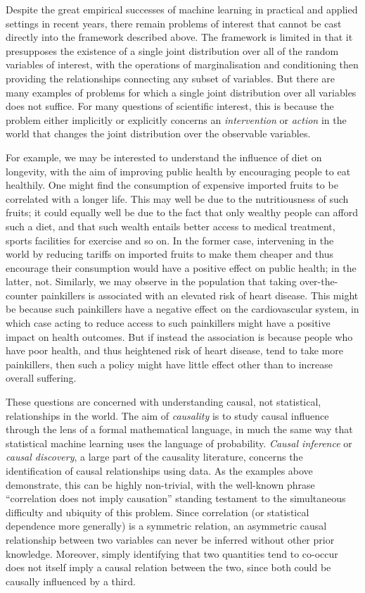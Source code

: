Despite the great empirical successes of machine learning in practical and applied settings in recent years, there remain problems of interest that cannot be cast directly into the framework described above. 
The framework is limited in that it presupposes the existence of a single joint distribution over all of the random variables of interest, with the operations of marginalisation and conditioning then providing the relationships connecting any subset of variables.
But there are many examples of problems for which a single joint distribution over all variables does not suffice. 
For many questions of scientific interest, this is because the problem either implicitly or explicitly concerns an \emph{intervention} or \emph{action} in the world that changes the joint distribution over the observable variables.

For example, we may be interested to understand the influence of diet on longevity, with the aim of improving public health by encouraging people to eat healthily. 
One might find the consumption of expensive imported fruits to be correlated with a longer life. This may well be due to the nutritiousness of such fruits; it could equally well be due to the fact that only wealthy people can afford such a diet, and that such wealth entails better access to medical treatment, sports facilities for exercise and so on. In the former case, intervening in the world by reducing tariffs on imported fruits to make them cheaper and thus encourage their consumption would have a positive effect on public health; in the latter, not.
Similarly, we may observe in the population that taking over-the-counter painkillers is associated with an elevated risk of heart disease. This might be because such painkillers have a negative effect on the cardiovascular system, in which case acting to reduce access to such painkillers might have a positive impact on health outcomes. But if instead the association is because people who have poor health, and thus heightened risk of heart disease, tend to take more painkillers, then such a policy might have little effect other than to increase overall suffering.

These questions are concerned with understanding causal, not statistical, relationships in the world. 
The aim of \emph{causality} is to study causal influence through the lens of a formal mathematical language, in much the same way that statistical machine learning uses the language of probability. 
\emph{Causal inference} or \emph{causal discovery}, a large part of the causality literature, concerns the identification of causal relationships using data.
As the examples above demonstrate, this can be highly non-trivial, with the well-known phrase ``correlation does not imply causation'' standing testament to the simultaneous difficulty and ubiquity of this problem.
Since correlation (or statistical dependence more generally) is a symmetric relation, an asymmetric causal relationship between two variables can never be inferred without other prior knowledge. 
Moreover, simply identifying that two quantities tend to co-occur does not itself imply a causal relation between the two, since both could be causally influenced by a third.

